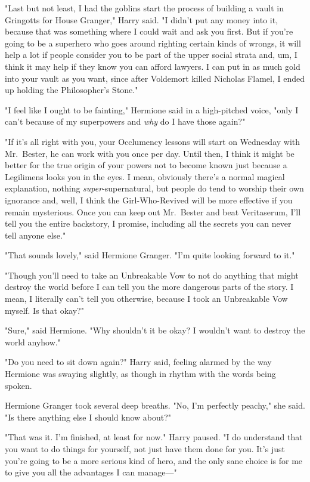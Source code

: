 "Last but not least, I had the goblins start the process of building a vault in
Gringotts for House Granger," Harry said. "I didn't put any money into it,
because that was something where I could wait and ask you first. But if you're
going to be a superhero who goes around righting certain kinds of wrongs, it
will help a lot if people consider you to be part of the upper social strata
and, um, I think it may help if they know you can afford lawyers. I can put in
as much gold into your vault as you want, since after Voldemort killed Nicholas
Flamel, I ended up holding the Philosopher's Stone."

"I feel like I ought to be fainting," Hermione said in a high-pitched voice,
"only I can't because of my superpowers and \emph{why} do I have those again?"

"If it's all right with you, your Occlumency lessons will start on Wednesday
with Mr.~Bester, he can work with you once per day. Until then, I think it
might be better for the true origin of your powers not to become known just
because a Legilimens looks you in the eyes. I mean, obviously there's a normal
magical explanation, nothing \emph{super}-supernatural, but people do tend to
worship their own ignorance and, well, I think the Girl-Who-Revived will be
more effective if you remain mysterious. Once you can keep out Mr.~Bester and
beat Veritaserum, I'll tell you the entire backstory, I promise, including all
the secrets you can never tell anyone else."

"That sounds lovely," said Hermione Granger. "I'm quite looking forward to it."

"Though you'll need to take an Unbreakable Vow to not do anything that might
destroy the world before I can tell you the more dangerous parts of the story.
I mean, I literally can't tell you otherwise, because I took an Unbreakable Vow
myself. Is that okay?"

"Sure," said Hermione. "Why shouldn't it be okay? I wouldn't want to destroy
the world anyhow."

"Do you need to sit down again?" Harry said, feeling alarmed by the way
Hermione was swaying slightly, as though in rhythm with the words being spoken.

Hermione Granger took several deep breaths. "No, I'm perfectly peachy," she
said. "Is there anything else I should know about?"

"That was it. I'm finished, at least for now." Harry paused. "I do understand
that you want to do things for yourself, not just have them done for you. It's
just{\el} you're going to be a more serious kind of hero, and the only sane
choice is for me to give you all the advantages I can manage—"

